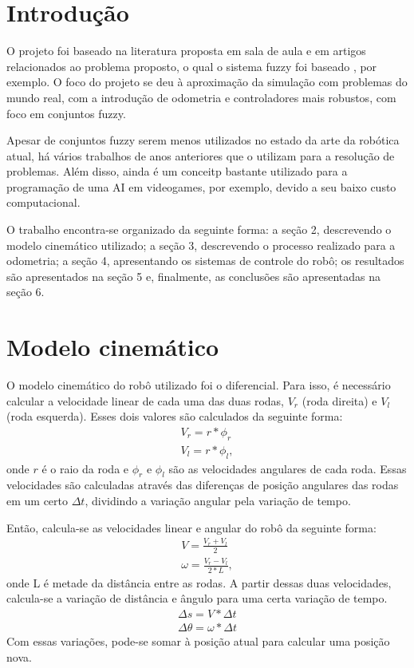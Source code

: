 \documentclass[twoside,conference,a4paper]{IEEEtran}
\begin{document}
\section{Introdução}
O projeto foi baseado na literatura proposta em sala de aula e em artigos relacionados ao problema proposto, o qual o sistema fuzzy foi baseado \cite{Reinhard:1995}, por exemplo. O foco do projeto se deu à aproximação da simulação com problemas do mundo real, com a introdução de odometria e controladores mais robustos, com foco em conjuntos fuzzy.

Apesar de conjuntos fuzzy serem menos utilizados no estado da arte da robótica atual, há vários trabalhos de anos anteriores que o utilizam para a resolução de problemas. Além disso, ainda é um conceitp bastante utilizado para a programação de uma AI em videogames, por exemplo, devido a seu baixo custo computacional.

O trabalho encontra-se organizado da seguinte forma: a seção 2, descrevendo o modelo cinemático utilizado; a seção 3, descrevendo o processo realizado para a odometria; a seção 4, apresentando os sistemas de controle do robô; os resultados são apresentados na seção 5 e, finalmente, as conclusões são apresentadas na seção 6. 

\section{Modelo cinemático}

O modelo cinemático do robô utilizado foi o diferencial. Para isso, é necessário calcular a velocidade linear de cada uma das duas rodas, $V_{r}$ (roda direita) e $V_{l}$ (roda esquerda). Esses dois valores são calculados da seguinte forma:
\begin{gather*}
V_{r} = r * \phi_{r} \\
V_{l} = r * \phi_{l},
\end{gather*}
onde $r$ é o raio da roda e $\phi_{r}$ e $\phi_{l}$ são as velocidades angulares de cada roda. Essas velocidades são calculadas através das diferenças de posição angulares das rodas em um certo $\Delta t$, dividindo a variação angular pela variação de tempo.

Então, calcula-se as velocidades linear e angular do robô da seguinte forma:
\begin{gather*}
V = \frac{V_{r} + V_{l}}{2} \\
\omega = \frac{V_{r} - V_{l}}{2 * L},
\end{gather*}
onde L é metade da distância entre as rodas. A partir dessas duas velocidades, calcula-se a variação de distância e ângulo para uma certa variação de tempo. 
\begin{gather*}
\Delta s = V * \Delta t \\
\Delta \theta = \omega * \Delta t
\end{gather*}
Com essas variações, pode-se somar à posição atual para calcular uma posição nova.
\end{document}
